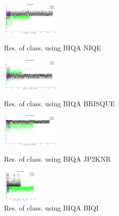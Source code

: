 \begin{figure}
\begin{minipage}{0.48\linewidth}
		\centering
		\includegraphics[width=0.9\linewidth, height=1.6cm]{pics/biqa_clas_niqe}
		\caption{Res. of class. using BIQA NIQE}
		\label{fig:clas_niqe}
	\end{minipage}
	\hfill
	\begin{minipage}{0.48\linewidth}
		\centering
		\includegraphics[width=0.9\linewidth, height=1.6cm]{pics/biqa_clas_brisque}
		\caption{Res. of class. using BIQA BRISQUE}
		\label{fig:clas_brisque}
	\end{minipage}
	\begin{minipage}{0.48\linewidth}
		\centering
		\includegraphics[width=0.9\linewidth, height=1.6cm]{pics/biqa_clas_jp2knr}
		\caption{Res. of class. using BIQA JP2KNR}
		\label{fig:clas_jp2knr}
	\end{minipage}
	\hfill
	\begin{minipage}{0.48\linewidth}
		\centering
		\includegraphics[width=0.9\linewidth, height=1.6cm]{pics/biqa_clas_biqi}
		\caption{Res. of class. using BIQA BIQI}
		\label{fig:clas_biqi}
	\end{minipage}
\end{figure}

